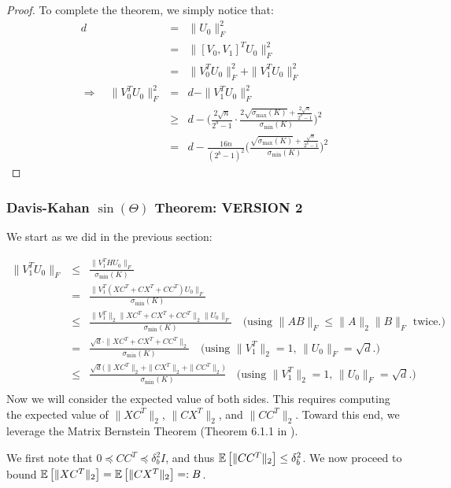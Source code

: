 \begin{proof}
To complete the theorem, we simply notice that:
\begin{eqnarray}
d &=& \|U_0\|_F^2 \\
&=&\|[V_0,V_1]^T U_0\|_F^2 \\
&=& \|V_0^T U_0\|_F^2 + \|V_1^T U_0\|_F^2\\
\Longrightarrow\quad  \|V_0^T U_0\|_F^2 &=& d - \|V_1^T U_0\|_F^2 \\
&\geq& d - \Bigg(\frac{2\sqrt{n}}{2^b-1} \cdot \frac{2\sqrt{\sigma_{\max}(K)} + \frac{2\sqrt{n}}{2^b-1} }{\sigma_{\min}(K)} \Bigg)^2 \\
&=& d - \frac{16n}{(2^b-1)^2} \Bigg( \frac{\sqrt{\sigma_{\max}(K)} + \frac{\sqrt{n}}{2^b-1} }{\sigma_{\min}(K)} \Bigg)^2
\end{eqnarray}
\end{proof}

\subsubsection{Davis-Kahan $\sin(\Theta)$ Theorem: VERSION 2}
We start as we did in the previous section: 

\begin{eqnarray*}
	\|V_1^T U_0\|_F
	&\leq& \frac{\|V_1^T H U_0\|_F}{\sigma_{\min}(K)}\\
	&=& \frac{\|V_1^T (XC^T + CX^T + CC^T) U_0\|_F}{\sigma_{\min}(K)}\\
	&\leq& \frac{\|V_1^T\|_2 \|XC^T + CX^T + CC^T\|_2 \|U_0\|_F}{\sigma_{\min}(K)} \quad \text{(using $\|AB\|_F \leq \|A\|_2 \|B\|_F$ twice.)}\\
	&=& \frac{\sqrt{d}\cdot \|XC^T + CX^T + CC^T\|_2}{\sigma_{\min}(K)} \quad \text{(using $\|V_1^T\|_2 = 1$, $\|U_0\|_F = \sqrt{d}$.)}\\
	&\leq& \frac{\sqrt{d}\Big(\|XC^T\|_2 + \|CX^T\|_2 + \|CC^T\|_2\Big)}{\sigma_{\min}(K)} \quad \text{(using $\|V_1^T\|_2 = 1$, $\|U_0\|_F = \sqrt{d}$.)}\\
\end{eqnarray*}
Now we will consider the expected value of both sides.  This requires computing the expected value of $\|XC^T\|_2$, $\|CX^T\|_2$, and $\|CC^T\|_2$.  Toward this end, we leverage the Matrix Bernstein Theorem (Theorem 6.1.1 in \citep{tropp15}).

We first note that $0 \preceq CC^T \preceq \delta_b^2 I$, and thus $\expect{}{\|CC^T\|_2} \leq \delta_b^2$.
We now proceed to bound $\expect{}{\|XC^T\|_2} = \expect{}{\|CX^T\|_2} \eqdef B$.

